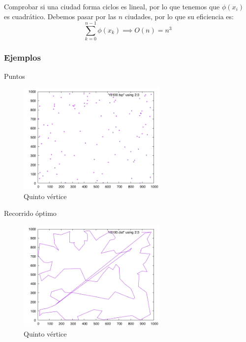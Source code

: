 \begin{frame}
	\begin{block}{ }
	Comprobar si una ciudad forma ciclos es lineal, por lo que tenemos que $\phi (x_i)$
	es cuadrático.
	Debemos pasar por las $n$ ciudades, por lo que su eficiencia es:
	\[\sum_{k=0}^{n-1}\phi (x_k) \implies O(n) = n^3\]
	\end{block}
\end{frame}


\subsubsection{Ejemplos}
\begin{frame}
	\begin{exampleblock}{Puntos}
	\begin{figure}[htbH]
		\centering
		\includegraphics[width=0.65\textwidth]{../Viajante/Imagenes/rd100.png}
		\caption{Quinto vértice}
	\end{figure}
	\end{exampleblock}
\end{frame}

\begin{frame}
	\begin{exampleblock}{ Recorrido óptimo}
	\begin{figure}[htbH]
		\centering
		\includegraphics[width=0.65\textwidth]{../Viajante/Imagenes/rd100_opt.png}
		\caption{Quinto vértice}
	\end{figure}
	\end{exampleblock}
\end{frame}




